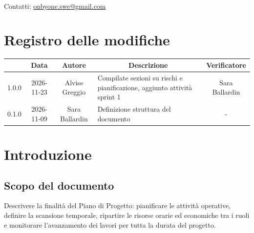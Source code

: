 \documentclass[11pt, a4paper]{article}
\begin{document}
\begin{titlepage}
		\vspace{0.5cm}
		
		{\large Contatti: \href{mailto:onbyone.swe@gmail.com}{onbyone.swe@gmail.com} }
		
	\end{titlepage}
	
	\newpage
	
	\section*{Registro delle modifiche}
	
	\vspace{1cm}
	\begin{center}
		\renewcommand{\arraystretch}{1.5}
		\begin{tabularx}{\textwidth}{|c|c|c|X|c|}
			\hline
			\rowcolor{gray!10}
			\multicolumn{1}{|c|}{\textbf{Versione}}   &
			\multicolumn{1}{c|}{\textbf{Data}}        &
			\multicolumn{1}{c|}{\textbf{Autore}}      &
			\multicolumn{1}{c|}{\textbf{Descrizione}} &
			\multicolumn{1}{c|}{\textbf{Verificatore}} \\
			\hline
			1.0.0 & 2026-11-23 & Alvise Greggio & Compilate sezioni su rischi e pianificazione, aggiunto attività sprint 1 & Sara Ballardin \\
			\hline
			0.1.0 & 2026-11-09 & Sara Ballardin & Definizione struttura del documento & - \\
			\hline
		\end{tabularx}
	\end{center}
	\vfill
	\newpage
	\tableofcontents
	\newpage
	
	
	\section{Introduzione}
	
	\subsection{Scopo del documento}
	Descrivere la finalità del Piano di Progetto: pianificare le attività operative, definire la scansione temporale, ripartire le risorse orarie ed economiche tra i ruoli e monitorare l'avanzamento dei lavori per tutta la durata del progetto.
	
\end{document}
